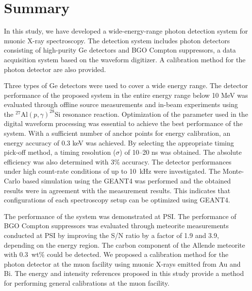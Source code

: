 
\section{Summary} \label{sec:summary}
In this study, we have developed a wide-energy-range photon detection system for muonic X-ray spectroscopy.
The detection system includes photon detectors consisting of high-purity Ge detectors and BGO Compton suppressors, a data acquisition system based on the waveform digitizer. 
A calibration method for the photon detector are also provided.

Three types of Ge detectors were used to cover a wide energy range.
The detector performance of the proposed system in the entire energy range below 10 MeV was evaluated through offline source measurements and in-beam experiments using the ${}^{27}\mathrm{Al}(p,\gamma)^{28}\mathrm{Si}$ resonance reaction.
Optimization of the parameter used in the digital waveform processing was essential to achieve the best performance of the system.
With a sufficient number of anchor points for energy calibration, an energy accuracy of 0.3 keV was achieved.
By selecting the appropriate timing pick-off method, a timing resolution ($\sigma$) of 10--20 ns was obtained.
The absolute efficiency was also determined with 3\% accuracy.
The detector performances under high count-rate conditions of up to 10~kHz were investigated.
The Monte-Carlo based simulation using the GEANT4 was performed and the obtained results were in agreement with the measurement results. 
This indicates that configurations of each spectroscopy setup can be optimized using GEANT4.

The performance of the system was demonstrated at PSI.
The performance of BGO Compton suppressors was evaluated through meteorite measurements conducted at PSI by improving the S/N ratio by a factor of 1.9 and 3.9, depending on the energy region. 
The carbon component of the Allende meteorite with 0.3~wt\% could be detected. 
We proposed a calibration method for the photon detector at the muon facility using muonic X-rays emitted from Au and Bi.
The energy and intensity references proposed in this study provide a method for performing general calibrations at the muon facility.




